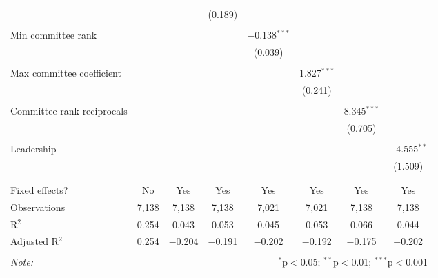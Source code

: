 \documentclass{article}
\begin{document}
\begin{table}[!htbp]
{{\begin{tabular}{@{\extracolsep{5pt}}lccccccc}
          &  &  & (0.189) &  &  &  &  \\ 
          & & & & & & & \\ 
         Min committee rank &  &  &  & $-$0.138$^{***}$ &  &  &  \\ 
          &  &  &  & (0.039) &  &  &  \\ 
          & & & & & & & \\ 
         Max committee coefficient &  &  &  &  & 1.827$^{***}$ &  &  \\ 
          &  &  &  &  & (0.241) &  &  \\ 
          & & & & & & & \\ 
         Committee rank reciprocals &  &  &  &  &  & 8.345$^{***}$ &  \\ 
          &  &  &  &  &  & (0.705) &  \\ 
          & & & & & & & \\ 
         Leadership &  &  &  &  &  &  & $-$4.555$^{**}$ \\ 
          &  &  &  &  &  &  & (1.509) \\ 
          & & & & & & & \\ 
        \hline \\[-1.8ex] 
        Fixed effects? & No & Yes & Yes & Yes & Yes & Yes & Yes \\ 
        Observations & 7,138 & 7,138 & 7,138 & 7,021 & 7,021 & 7,138 & 7,138 \\ 
        R$^{2}$ & 0.254 & 0.043 & 0.053 & 0.045 & 0.053 & 0.066 & 0.044 \\ 
        Adjusted R$^{2}$ & 0.254 & $-$0.204 & $-$0.191 & $-$0.202 & $-$0.192 & $-$0.175 & $-$0.202 \\ 
        \hline 
        \hline \\[-1.8ex] 
        \textit{Note:}  & \multicolumn{7}{r}{$^{*}$p$<$0.05; $^{**}$p$<$0.01; $^{***}$p$<$0.001} \\ 
        \end{tabular} 
    }}
  \end{table} 
\end{document}
